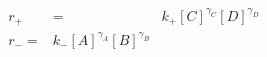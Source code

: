 \begin{eqnarray}
r_+  & = & k_+[C]^{\gamma_C}[D]^{\gamma_D} \\
r_-  = & k_-[A]^{\gamma_A}[B]^{\gamma_B} \\
\end{eqnarray}